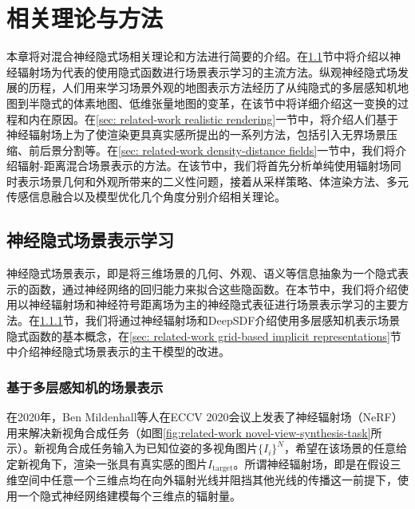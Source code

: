 \chapter{相关理论与方法}
\label{chapter:related-work}
本章将对混合神经隐式场相关理论和方法进行简要的介绍。在\ref{sec: related-work implicit scene representation learning}节中将介绍以神经辐射场\cite{mildenhall_nerf_2020}为代表的使用隐式函数进行场景表示学习的主流方法。纵观神经隐式场发展的历程，人们用来学习场景外观的地图表示方法经历了从纯隐式的多层感知机地图到半隐式的体素地图、低维张量地图的变革，在该节中将详细介绍这一变换的过程和内在原因。在\ref{sec: related-work realistic rendering}一节中，将介绍人们基于神经辐射场上为了使渲染更具真实感所提出的一系列方法，包括引入无界场景压缩、前后景分割等。在\ref{sec: related-work density-distance fields}一节中，我们将介绍辐射-距离混合场景表示的方法。在该节中，我们将首先分析单纯使用辐射场同时表示场景几何和外观所带来的二义性问题，接着从采样策略、体渲染方法、多元传感信息融合以及模型优化几个角度分别介绍相关理论。

\section{神经隐式场景表示学习}
\label{sec: related-work implicit scene representation learning}

神经隐式场景表示，即是将三维场景的几何、外观、语义等信息抽象为一个隐式表示的函数，通过神经网络的回归能力来拟合这些隐函数。在本节中，我们将介绍使用以神经辐射场和神经符号距离场为主的神经隐式表征进行场景表示学习的主要方法。在\ref{sec: related-work MLP-based neural implicit representations}节，我们将通过神经辐射场和DeepSDF介绍使用多层感知机表示场景隐式函数的基本概念，在\ref{sec: related-work grid-based implicit representations}节中介绍神经隐式场景表示的主干模型的改进。


\subsection{基于多层感知机的场景表示}
\label{sec: related-work MLP-based neural implicit representations}

在2020年，Ben Mildenhall等人在ECCV 2020会议上发表了神经辐射场\cite{mildenhall_nerf_2020}（NeRF）用来解决新视角合成任务（如图\ref{fig:related-work novel-view-synthesis-task}所示）。新视角合成任务输入为已知位姿的多视角图片$\{{I}_i\}^N$，希望在该场景的任意给定新视角下，渲染一张具有真实感的图片${I}_\text{target}$。所谓神经辐射场，即是在假设三维空间中任意一个三维点均在向外辐射光线并阻挡其他光线的传播这一前提下，使用一个隐式神经网络建模每个三维点的辐射量。

